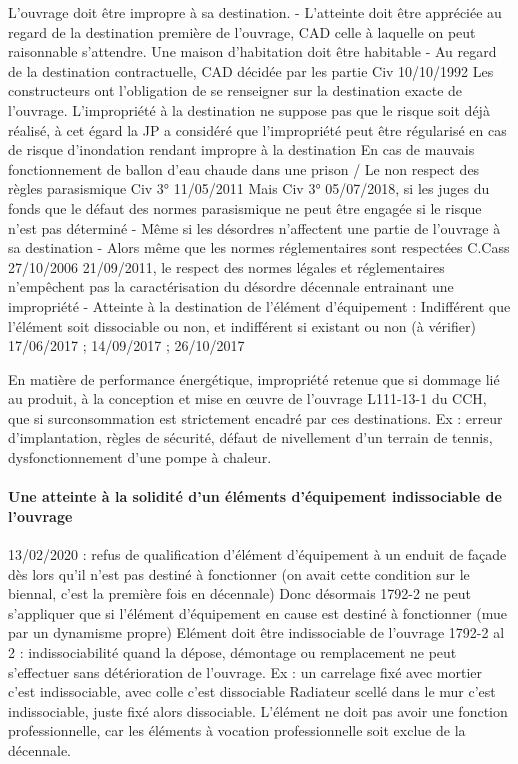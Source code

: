 			L’ouvrage doit être impropre à sa destination.
			-	L’atteinte doit être appréciée au regard de la destination première de l’ouvrage, CAD celle à laquelle on peut raisonnable s’attendre. Une maison d’habitation doit être habitable
			-	Au regard de la destination contractuelle, CAD décidée par les partie Civ 10/10/1992
			Les constructeurs ont l’obligation de se renseigner sur la destination exacte de l’ouvrage.
			L’impropriété à la destination ne suppose pas que le risque soit déjà réalisé, à cet égard la JP a considéré que l’impropriété peut être régularisé en cas de risque d’inondation rendant impropre à la destination
			En cas de mauvais fonctionnement de ballon d’eau chaude dans une prison / Le non respect des règles parasismique Civ 3° 11/05/2011
			Mais Civ 3° 05/07/2018, si les juges du fonds que le défaut des normes parasismique ne peut être engagée si le risque n’est pas déterminé
			-	Même si les désordres n’affectent une partie de l’ouvrage à sa destination
			-	Alors même que les normes réglementaires sont respectées
			C.Cass 27/10/2006 21/09/2011, le respect des normes légales et réglementaires n’empêchent pas la caractérisation du désordre décennale entrainant une impropriété
			-	Atteinte à la destination de l’élément d’équipement : Indifférent que l’élément soit dissociable ou non, et indifférent si existant ou non (à vérifier)
			17/06/2017 ; 14/09/2017 ; 26/10/2017

			En matière de performance énergétique, impropriété retenue que si dommage lié au produit, à la conception et mise en œuvre de l’ouvrage L111-13-1 du CCH, que si surconsommation est strictement encadré par ces destinations.
			Ex : erreur d’implantation, règles de sécurité, défaut de nivellement d’un terrain de tennis, dysfonctionnement d’une pompe à chaleur.


			\paragraph{Une atteinte à la solidité d'un éléments d'équipement indissociable de l'ouvrage}

			13/02/2020 : refus de qualification d’élément d’équipement à un enduit de façade dès lors qu’il n’est pas destiné à fonctionner (on avait cette condition sur le biennal, c’est la première fois en décennale)
			Donc désormais 1792-2 ne peut s’appliquer que si l’élément d’équipement en cause est destiné à fonctionner (mue par un dynamisme propre)
			Elément doit être indissociable de l’ouvrage 1792-2 al 2 : indissociabilité quand la dépose, démontage ou remplacement ne peut s’effectuer sans détérioration de l’ouvrage.
			Ex : un carrelage fixé avec mortier c’est indissociable, avec colle c’est dissociable
			Radiateur scellé dans le mur c’est indissociable, juste fixé alors dissociable.
			L’élément ne doit pas avoir une fonction professionnelle, car les éléments à vocation professionnelle soit exclue de la décennale.


